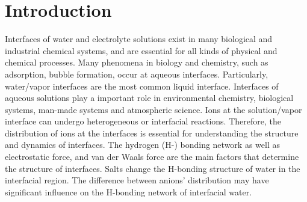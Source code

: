 \chapter{Introduction}\label{CHAPETR_1}
Interfaces of water and electrolyte solutions exist in many biological and industrial chemical systems, and
are essential for all kinds of physical \cite{Yamamoto2008, Salmeron2009,Balajka2018} and chemical processes. \cite{Tobias99,Benderskii00,Benderskii02}
Many phenomena in biology and chemistry, such as adsorption,
bubble formation, occur at aqueous interfaces. \cite{Ball2008}
Particularly, water/vapor interfaces are the most common liquid interface. \cite{Kuo2004b} 
Interfaces of aqueous solutions play a important role in environmental chemistry, biological systems, \cite{ZhangLY09,LoNostro2012} 
man-made systems \cite{Richmond02,LiuH04,Asahi01} and atmospheric science. \cite{TianCS08,Irwin88} 
Ions at the solution/vapor interface can undergo heterogeneous or interfacial reactions. \cite{HuJH95,LiuDF04,Clifford07,Manna13,Pillar2014}
Therefore, the distribution of ions at the interfaces is essential for understanding the structure and dynamics of interfaces. 
The hydrogen (H-) bonding network \cite{Eisenberg1969,Speedy1976,Poole1994,Soper2008b,Nilsson2011,Ball2001,Pettersson2015} as well as electrostatic force, and van der Waals force are the main factors that determine the structure of interfaces. 
Salts change the H-bonding structure of water in the interfacial region. \cite{EAR04,McLain2006,Ball2008} 
The difference between anions' distribution may have significant influence on the H-bonding network of interfacial water. \cite{Morita2008}

